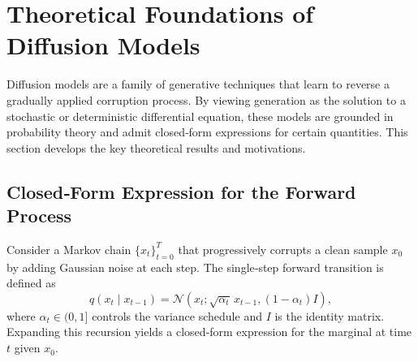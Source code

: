 

\section{Theoretical Foundations of Diffusion Models}

Diffusion models are a family of generative techniques that learn to
reverse a gradually applied corruption process.  By viewing
generation as the solution to a stochastic or deterministic
differential equation, these models are grounded in probability
theory and admit closed‑form expressions for certain quantities.
This section develops the key theoretical results and motivations.

\subsection{Closed‑Form Expression for the Forward Process}

Consider a Markov chain $\{x_t\}_{t=0}^T$ that progressively
corrupts a clean sample $x_0$ by adding Gaussian noise at each step.
The single‑step forward transition is defined as
\begin{equation}
  q(x_t \mid x_{t-1}) = \mathcal{N}(x_t; \sqrt{\alpha_t}\,x_{t-1}, (1-\alpha_t)I),
\end{equation}
where $\alpha_t \in (0,1]$ controls the variance schedule and $I$ is
the identity matrix.  Expanding this recursion yields a closed‑form
expression for the marginal at time $t$ given $x_0$.

